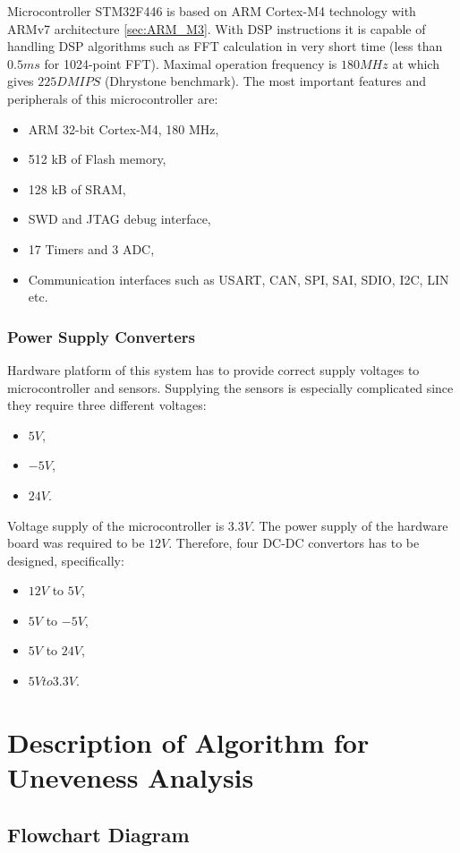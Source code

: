 \documentclass[twoside]{ctuthesis}
\theoremstyle{plain}
\theoremstyle{definition}
\theoremstyle{note}
\begin{document}
	Microcontroller STM32F446 is based on ARM Cortex-M4 technology with ARMv7 architecture \ref{sec:ARM_M3}. With DSP instructions it is capable of handling DSP algorithms such as FFT calculation in very short time (less than $0.5 ms$ for 1024-point FFT). Maximal operation frequency is $180 MHz$ at which gives $225 DMIPS$ (Dhrystone benchmark). The most important features and peripherals of this microcontroller are:
\begin{itemize}
	\setlength{\itemsep}{5pt}
	\item ARM 32-bit Cortex-M4, 180 MHz,
	\item 512 kB of Flash memory,
	\item 128 kB of SRAM,
	\item SWD and JTAG debug interface,
	\item 17 Timers and 3 ADC,
	\item Communication interfaces such as USART, CAN, SPI, SAI, SDIO, I2C, LIN etc.
\end{itemize}	
\subsubsection{Power Supply Converters}
Hardware platform of this system has to provide correct supply voltages to microcontroller and sensors. Supplying the sensors is especially complicated since they require three different voltages:
\begin{itemize}
	\setlength{\itemsep}{5pt}
	\item $5 V$,
	\item $-5 V$,
	\item $24 V$.
\end{itemize}
Voltage supply of the microcontroller is $3.3 V$.
The power supply of the hardware board was required to be $12 V$. Therefore, four DC-DC convertors has to be designed, specifically:
\begin{itemize}
	\setlength{\itemsep}{5pt}
	\item $12 V$ to $5 V$,
	\item $5 V$ to $-5 V$,
	\item $5 V$ to $24 V$,
	\item $5 V to 3.3 V$.
\end{itemize}

\section{Description of Algorithm for Uneveness Analysis}
\subsection{Flowchart Diagram}
\end{document}
